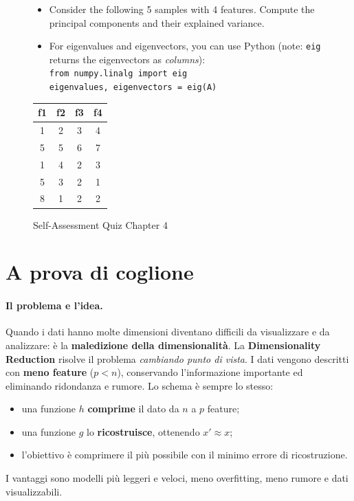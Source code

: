\begin{figure}[h!]
    \centering
    \begin{minipage}{0.75\textwidth}
    \begin{itemize}
        \item Consider the following 5 samples with 4 features. Compute the principal components and their explained variance.
        \item For eigenvalues and eigenvectors, you can use Python (note: \texttt{eig} returns the eigenvectors as \emph{columns}):\\
        \texttt{from numpy.linalg import eig}\\
        \texttt{eigenvalues, eigenvectors = eig(A)}
    \end{itemize}

    \vspace{0.3cm}
    \centering
    \begin{tabular}{cccc}
        \toprule
        f1 & f2 & f3 & f4 \\
        \midrule
        1 & 2 & 3 & 4 \\
        5 & 5 & 6 & 7 \\
        1 & 4 & 2 & 3 \\
        5 & 3 & 2 & 1 \\
        8 & 1 & 2 & 2 \\
        \bottomrule
    \end{tabular}
    \end{minipage}
    \caption{Self-Assessment Quiz Chapter 4}
\end{figure}


\section{A prova di coglione}

\paragraph*{Il problema e l'idea.}
Quando i dati hanno molte dimensioni diventano difficili da visualizzare e da analizzare: è la \textbf{maledizione della dimensionalità}. La \textbf{Dimensionality Reduction} risolve il problema \emph{cambiando punto di vista}. I dati vengono descritti con \textbf{meno feature} ($p < n$), conservando l'informazione importante ed eliminando ridondanza e rumore. Lo schema è sempre lo stesso:
\begin{itemize}
    \item una funzione $h$ \textbf{comprime} il dato da $n$ a $p$ feature;
    \item una funzione $g$ lo \textbf{ricostruisce}, ottenendo $x' \approx x$;
    \item l'obiettivo è comprimere il più possibile con il minimo errore di ricostruzione.
\end{itemize}
I vantaggi sono modelli più leggeri e veloci, meno overfitting, meno rumore e dati visualizzabili.

